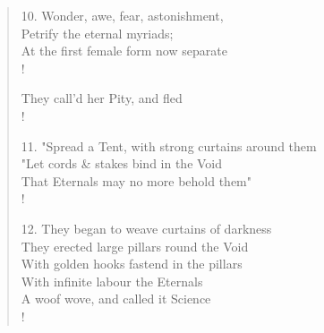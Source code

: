 \documentclass[9pt]{extarticle}
\begin{document}
\begin{verse}
\begin{altverse}
		10. Wonder, awe, fear, astonishment,\\
		Petrify the eternal myriads;\\
		At the first female form now separate\\!
		
		They call'd her Pity, and fled\\!
		
		11. "Spread a Tent, with strong curtains around them\\
		"Let cords \& stakes bind in the Void\\
		That Eternals may no more behold them"\\!
		
		12. They began to weave curtains of darkness\\
		They erected large pillars round the Void\\
		With golden hooks fastend in the pillars\\
		With infinite labour the Eternals\\
		A woof wove, and called it Science\\!
		
\end{altverse}
\end{verse}	
\end{document}
